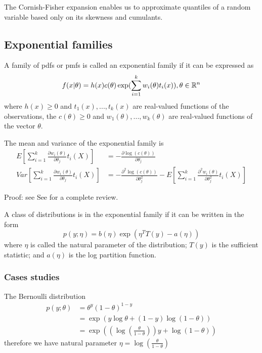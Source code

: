 \begin{refsection}
\begin{remark}[motivation]
	The Cornish-Fisher expansion enables us to approximate quantiles of a random variable based only on its skewness and cumulants.	
\end{remark}


\subsection{Exponential families}
\begin{definition}
\cite[111]{casella2002statistical}
A family of pdfs or pmfs is called an exponential family if it can be expressed as
$$f(x|\theta) = h(x)c(\theta)\exp(\sum_{i=1}^k w_i(\theta)t_i(x)),\theta \in \mathbb{R}^n$$
where $h(x) \geq 0$ and $t_1(x),...,t_k(x)$ are real-valued functions of the observations, the $c(\theta)\geq 0$ and $w_1(\theta),...,w_k(\theta)$ are real-valued functions of the vector $\theta$.
\end{definition}

\begin{theorem}
\cite[112]{casella2002statistical}
The mean and variance of the exponential family is
\begin{align}
 E[\sum_{i=1}^k \frac{\partial w_i(\theta)}{\partial \theta_j} t_i(X)] &= -\frac{\partial \log(c(\theta))}{\partial \theta_j}\\
 Var[\sum_{i=1}^k \frac{\partial w_i(\theta)}{\partial \theta_j} t_i(X)] &= -\frac{\partial^2 \log(c(\theta))}{\partial \theta_j^2} - E[\sum_{i=1}^k \frac{\partial^2 w_i(\theta)}{\partial \theta_j^2} t_i(X)]
\end{align}
\end{theorem}
Proof: see \cite[132]{casella2002statistical}
See \cite[622]{casella2002statistical} for a complete review.

\begin{definition}
	A class of distributions is in the exponential family if it can be written in the form 
	$$p(y;\eta) = b(\eta)\exp(\eta^TT(y) - a(\eta))$$
	where $\eta$ is called the natural parameter of the distribution; $T(y)$ is the sufficient statistic; and $a(\eta)$ is the log partition function.
\end{definition}

\iffalse
\subsubsection{Cases studies}

The Bernoulli distribution
\begin{align*}
p(y;\theta) &= \theta^y (1-\theta)^{1-y} \\
			&= \exp(y\log \theta + (1-y)\log(1-\theta))\\
			&= \exp((\log(\frac{\theta}{1-\theta}))y + \log(1-\theta))
\end{align*}
therefore we have natural parameter $\eta = \log(\frac{\theta}{1-\theta})$




\end{refsection}
